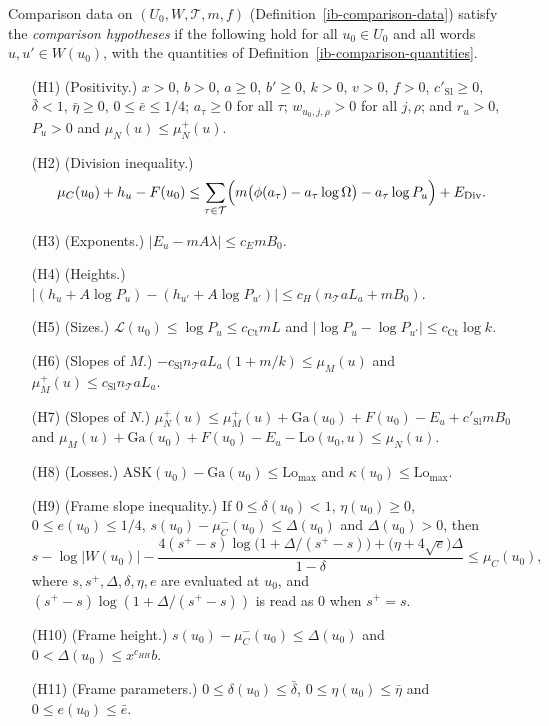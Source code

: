 \begin{definition}\label{ib-comparison-hypotheses}
Comparison data on $(U_0,W,\mathcal T,m,f)$ (Definition~\ref{ib-comparison-data})
satisfy the \emph{comparison hypotheses} if the following hold for all
$u_0\in U_0$ and all words $u,u'\in W(u_0)$, with the quantities of
Definition~\ref{ib-comparison-quantities}.
\begin{enumerate}
\item[(H1)] (Positivity.) $x>0$, $b>0$, $a\geq0$, $b'\geq0$, $k>0$, $v>0$,
  $f>0$, $c'_{\mathrm{Sl}}\geq0$, $\bar\delta<1$, $\bar\eta\geq0$,
  $0\leq\bar e\leq1/4$; $a_\tau\geq0$ for all $\tau$; $w_{u_0,j,\rho}>0$ for all
  $j,\rho$; and $r_u>0$, $P_u>0$ and $\mu_N(u)\leq\mu_N^+(u)$.
\item[(H2)] (Division inequality.)
  \[
   \mu_C(u_0)+h_u-F(u_0)\leq\sum_{\tau\in\mathcal T}\Bigl(m\bigl(\phi(a_\tau)-a_\tau\log\Omega\bigr)
   -a_\tau\log P_u\Bigr)+E_{\mathrm{Div}}.
  \]
\item[(H3)] (Exponents.) $|E_u-mA\lambda|\leq c_EmB_0$.
\item[(H4)] (Heights.) $\bigl|(h_u+A\log P_u)-(h_{u'}+A\log P_{u'})\bigr|
  \leq c_H(n_{\mathcal T}aL_a+mB_0)$.
\item[(H5)] (Sizes.) $\mathcal L(u_0)\leq\log P_u\leq c_{\mathrm{Ct}}mL$ and
  $|\log P_u-\log P_{u'}|\leq c_{\mathrm{Ct}}\log k$.
\item[(H6)] (Slopes of $M$.) $-c_{\mathrm{Sl}}n_{\mathcal T}aL_a(1+m/k)\leq\mu_M(u)$
  and $\mu_M^+(u)\leq c_{\mathrm{Sl}}n_{\mathcal T}aL_a$.
\item[(H7)] (Slopes of $N$.)
  $\mu_N^+(u)\leq\mu_M^+(u)+\mathrm{Ga}(u_0)+F(u_0)-E_u+c'_{\mathrm{Sl}}mB_0$ and
  $\mu_M(u)+\mathrm{Ga}(u_0)+F(u_0)-E_u-\mathrm{Lo}(u_0,u)\leq\mu_N(u)$.
\item[(H8)] (Losses.) $\mathrm{ASK}(u_0)-\mathrm{Ga}(u_0)\leq\mathrm{Lo}_{\max}$ and
  $\kappa(u_0)\leq\mathrm{Lo}_{\max}$.
\item[(H9)] (Frame slope inequality.) If $0\leq\delta(u_0)<1$, $\eta(u_0)\geq0$,
  $0\leq e(u_0)\leq1/4$, $s(u_0)-\mu_C^-(u_0)\leq\Delta(u_0)$ and
  $\Delta(u_0)>0$, then
  \[
   s-\log|W(u_0)|-\frac{4(s^+-s)\log\bigl(1+\Delta/(s^+-s)\bigr)
   +\bigl(\eta+4\sqrt e\bigr)\Delta}{1-\delta}\leq\mu_C(u_0),
  \]
  where $s,s^+,\Delta,\delta,\eta,e$ are evaluated at $u_0$, and
  $(s^+-s)\log(1+\Delta/(s^+-s))$ is read as $0$ when $s^+=s$.
\item[(H10)] (Frame height.) $s(u_0)-\mu_C^-(u_0)\leq\Delta(u_0)$ and
  $0<\Delta(u_0)\leq x^{c_{HH}}b$.
\item[(H11)] (Frame parameters.) $0\leq\delta(u_0)\leq\bar\delta$,
  $0\leq\eta(u_0)\leq\bar\eta$ and $0\leq e(u_0)\leq\bar e$.
\end{enumerate}
\end{definition}
